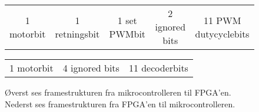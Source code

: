 \begin{figure}[th!]
\centering
\begin{tabular}{c|c|c|c|c}
1 motorbit &1 retningsbit & 1 set PWMbit & 2 ignored bits & 11 PWM dutycyclebits\\
\end{tabular}
 \begin{tabular}{c|c|c}
 1 motorbit & 4 ignored bits & 11 decoderbits
 \end{tabular}
\captionsetup{type=figure}
\caption[SPI framestruktur]{Øverst ses framestrukturen fra mikrocontrolleren til FPGA'en. Nederst ses framestrukturen fra FPGA'en til mikrocontrolleren.}
\label{tb:protokol1}
\end{figure}

   
  
